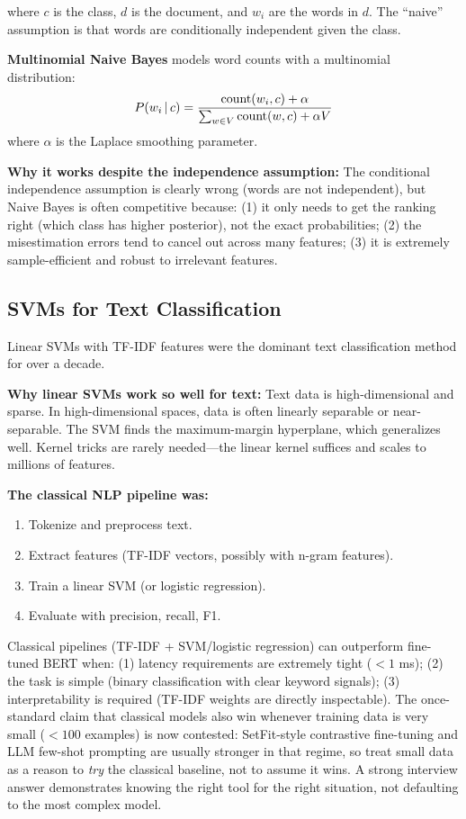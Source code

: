 where $c$ is the class, $d$ is the document, and $w_i$ are the words in $d$. The
``naive'' assumption is that words are conditionally independent given the class.

\textbf{Multinomial Naive Bayes} models word counts with a multinomial distribution:
\begin{equation}
    P(w_i \,|\, c) = \frac{\text{count}(w_i, c) + \alpha}{\sum_{w \in V} \text{count}(w, c) + \alpha V}
\end{equation}
where $\alpha$ is the Laplace smoothing parameter.

\textbf{Why it works despite the independence assumption:} The conditional independence
assumption is clearly wrong (words are not independent), but Naive Bayes is often
competitive because: (1) it only needs to get the ranking right (which class has higher
posterior), not the exact probabilities; (2) the misestimation errors tend to cancel out
across many features; (3) it is extremely sample-efficient and robust to irrelevant
features.

\subsection{SVMs for Text Classification}
\label{sec:svm_text}

Linear SVMs with TF-IDF features were the dominant text classification method for over a
decade.

\textbf{Why linear SVMs work so well for text:} Text data is high-dimensional and sparse.
In high-dimensional spaces, data is often linearly separable or near-separable. The SVM
finds the maximum-margin hyperplane, which generalizes well. Kernel tricks are rarely
needed---the linear kernel suffices and scales to millions of features.

\textbf{The classical NLP pipeline was:}
\begin{enumerate}
    \item Tokenize and preprocess text.
    \item Extract features (TF-IDF vectors, possibly with n-gram features).
    \item Train a linear SVM (or logistic regression).
    \item Evaluate with precision, recall, F1.
\end{enumerate}

\begin{keyinsight}
Classical pipelines (TF-IDF + SVM/logistic regression) can outperform fine-tuned BERT when:
(1) latency requirements are extremely tight ($< 1$ ms); (2) the task is simple (binary
classification with clear keyword signals); (3) interpretability is required (TF-IDF
weights are directly inspectable). The once-standard claim that classical models also win
whenever training data is very small ($< 100$ examples) is now contested: SetFit-style
contrastive fine-tuning and LLM few-shot prompting are usually stronger in that regime, so
treat small data as a reason to \emph{try} the classical baseline, not to assume it wins. A
strong interview answer demonstrates knowing the right tool for the right situation, not
defaulting to the most complex model.
\end{keyinsight}

